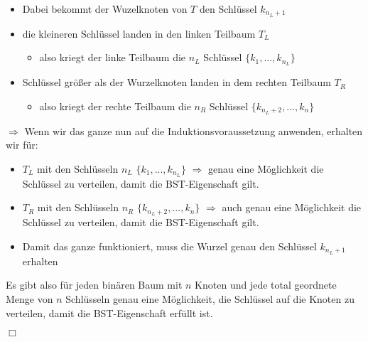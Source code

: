 \begin{itemize}
	\item Dabei bekommt der Wuzelknoten von $T$ den Schlüssel $k_{n_{L}+1}$
	\item die kleineren Schlüssel landen in den linken Teilbaum $T_{L}$
	\begin{itemize}
		\item also kriegt der linke Teilbaum die $n_{L}$ Schlüssel $\{k_{1},...,k_{n_{L}}\}$
	\end{itemize}
	\item Schlüssel größer als der Wurzelknoten landen in dem rechten Teilbaum $T_{R}$
	\begin{itemize}
		\item also kriegt der rechte Teilbaum die $n_{R}$ Schlüssel $\{k_{n_{L}+2},...,k_{n}\}$
	\end{itemize}
\end{itemize}

$\Rightarrow$ Wenn wir das ganze nun auf die Induktionsvoraussetzung anwenden, erhalten wir für:
\begin{itemize}
	\item $T_{L}$ mit den Schlüsseln $n_{L}$ $\{k_{1},...,k_{n_{L}}\}$ $\Rightarrow$ genau eine Möglichkeit die Schlüssel zu verteilen, damit die BST-Eigenschaft gilt.
	\item $T_{R}$ mit den Schlüsseln $n_{R}$ $\{k_{n_{L}+2},...,k_{n}\}$ $\Rightarrow$ auch genau eine Möglichkeit die Schlüssel zu verteilen, damit die BST-Eigenschaft gilt.
	\item Damit das ganze funktioniert, muss die Wurzel genau den Schlüssel $k_{n_{L}+1}$ erhalten
\end{itemize}

Es gibt also für jeden binären Baum mit $n$ Knoten und jede total geordnete Menge von $n$ Schlüsseln genau eine Möglichkeit, die Schlüssel auf die Knoten zu verteilen, damit die BST-Eigenschaft erfüllt ist.
\begin{flushright}
$\Box$
\end{flushright}





 








